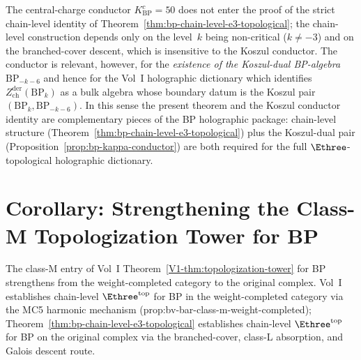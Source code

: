 \begin{remark}[Role of $K^{c}_{\mathrm{BP}} = 50$ in the present chapter]
\label{rem:bp-role-of-K-50}
The central-charge conductor $K^{c}_{\mathrm{BP}} = 50$ does not enter the
proof of the strict chain-level identity of
Theorem~\ref{thm:bp-chain-level-e3-topological}; the chain-level
construction depends only on the level~$k$ being non-critical
($k \ne -3$) and on the branched-cover descent, which is insensitive
to the Koszul conductor. The conductor is relevant, however,
for the \emph{existence of the Koszul-dual BP-algebra}
$\mathrm{BP}_{-k-6}$ and hence for the Vol~I holographic dictionary
which identifies $Z^{\mathrm{der}}_{\mathrm{ch}}(\mathrm{BP}_k)$ as
a bulk algebra whose boundary datum is the Koszul pair
$(\mathrm{BP}_k, \mathrm{BP}_{-k-6})$. In this sense the present
theorem and the Koszul conductor identity are complementary pieces
of the BP holographic package: chain-level structure
(Theorem~\ref{thm:bp-chain-level-e3-topological}) plus the
Koszul-dual pair (Proposition~\ref{prop:bp-kappa-conductor}) are
both required for the full $\Ethree$-topological holographic
dictionary.
\end{remark}

\section{Corollary: Strengthening the Class-M Topologization Tower for BP}
\label{sec:bp-corollary-strengthening}

\begin{corollary}
\label{cor:bp-E3-original-complex-not-just-weight-completed}
\ClaimStatusProvedHere
The class-M entry of Vol~I Theorem~\ref{V1-thm:topologization-tower} for BP
strengthens from the weight-completed category to the original
complex. Vol~I establishes chain-level $\Ethree^{\mathrm{top}}$ for BP
in the weight-completed category via the MC5 harmonic mechanism
(prop:bv-bar-class-m-weight-completed); Theorem~\ref{thm:bp-chain-level-e3-topological}
establishes chain-level $\Ethree^{\mathrm{top}}$ for BP on the
original complex via the branched-cover, class-L absorption, and
Galois descent route.
\end{corollary}

